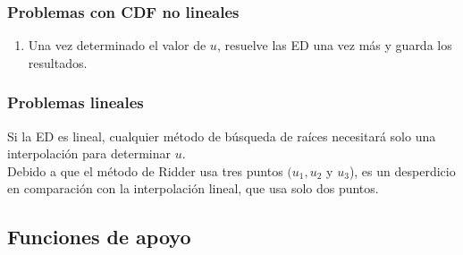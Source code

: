 \documentclass[12pt]{beamer}
\begin{document}
\begin{frame}
\frametitle{Problemas con CDF no lineales}
\begin{enumerate}[<+->]
\conti
\item Una vez determinado el valor de $u$, resuelve las ED una vez más y guarda los resultados.
\end{enumerate}
\end{frame}
\begin{frame}
\frametitle{Problemas lineales}
Si la ED es lineal, cualquier método de búsqueda de raíces necesitará solo una interpolación para determinar $u$.
\\
\bigskip
\pause
Debido a que el método de Ridder usa tres puntos $(u_{1}, u_{2}$ y $u_{3}$), es un desperdicio en comparación con la interpolación lineal, que usa solo dos puntos.
\end{frame}

\subsection{Funciones de apoyo}
\end{document}
